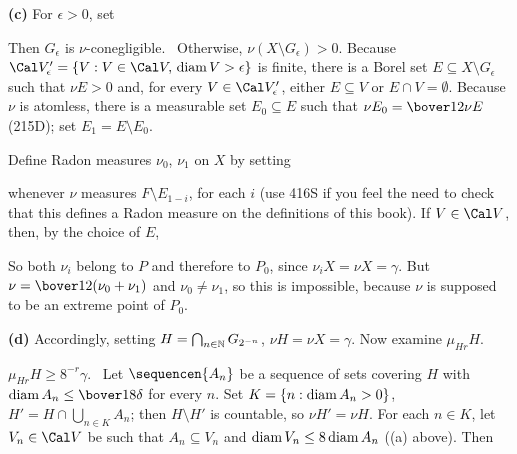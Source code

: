 {\medskip

{\bf (c)} For $\epsilon>0$, set


\noindent Then $G_{\epsilon}$ is $\nu$-conegligible.  \Prf\Quer\
Otherwise, $\nu(X\setminus G_{\epsilon})>0$.   Because
$\Cal V'_{\epsilon}=\{V:V\in\Cal V,\,\diam V>\epsilon\}$ is finite,
there is a Borel set $E\subseteq X\setminus G_{\epsilon}$ such that
$\nu E>0$ and, for every $V\in\Cal V'_{\epsilon}$, either $E\subseteq V$
or $E\cap V=\emptyset$.   Because $\nu$ is atomless, there is a
measurable set
$E_0\subseteq E$ such that $\nu E_0=\bover12\nu E$ (215D);  set
$E_1=E\setminus E_0$.

Define Radon measures $\nu_0$, $\nu_1$ on $X$ by setting


\noindent whenever $\nu$ measures $F\setminus E_{1-i}$, for each $i$
(use 416S if you feel the need to check that this defines a Radon
measure on the definitions of this book).   If $V\in\Cal V$, then, by
the choice of $E$,


\noindent So both $\nu_i$ belong to $P$ and therefore to $P_0$, since
$\nu_iX=\nu X=\gamma$.   But $\nu=\bover12(\nu_0+\nu_1)$ and
$\nu_0\ne\nu_1$, so this is impossible, because $\nu$ is supposed to be
an extreme point of $P_0$.\ \Bang\Qed

\medskip

{\bf (d)} Accordingly, setting $H=\bigcap_{n\in\Bbb N}G_{2^{-n}}$,
$\nu H=\nu X=\gamma$.   Now examine $\mu_{Hr}H$.

\medskip

 $\mu_{Hr}H\ge 8^{-r}\gamma$.   \Prf\ Let
$\sequencen{A_n}$ be a sequence of sets covering $H$ with
$\diam A_n\le\bover18\delta$ for every $n$.   Set $K=\{n:\mathop{\text{diam}} A_n>0\}$,
$H'=H\cap\bigcup_{n\in K}A_n$;  then $H\setminus H'$ is countable, so
$\nu H'=\nu H$.   For each $n\in K$, let $V_n\in\Cal V$ be such that
$A_n\subseteq V_n$ and $\mathop{\text{diam}} V_n\le 8\mathop{\text{diam}} A_n$ ((a) above).   Then

}
